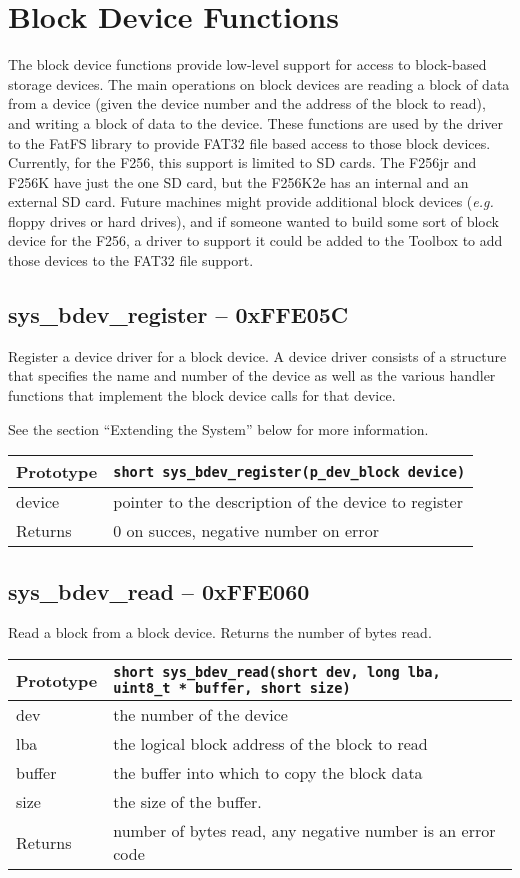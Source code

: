 \section{Block Device Functions}
The block device functions provide low-level support for access to block-based storage devices.
The main operations on block devices are reading a block of data from a device (given the device number and the
address of the block to read), and writing a block of data to the device.
These functions are used by the driver to the FatFS library to provide FAT32 file based access to those
block devices.
Currently, for the F256, this support is limited to SD cards. The F256jr and F256K have just the one SD card,
but the F256K2e has an internal and an external SD card.
Future machines might provide additional block devices ({\it e.g.} floppy drives or hard drives), and if someone
wanted to build some sort of block device for the F256, a driver to support it could be added to the Toolbox to
add those devices to the FAT32 file support.

\subsection*{sys\_bdev\_register -- 0xFFE05C}
Register a device driver for a block device. A device driver consists of a structure that specifies the name and number of the device as well as the various handler functions that implement the block device calls for that device.

See the section ``Extending the System'' below for more information.

\bigskip

\begin{tabular}{|l||l|} \hline
Prototype & \lstinline!short sys_bdev_register(p_dev_block device)! \\ \hline
device & pointer to the description of the device to register \\ \hline
Returns & 0 on succes, negative number on error \\ \hline
\end{tabular}

\subsection*{sys\_bdev\_read -- 0xFFE060}
Read a block from a block device. Returns the number of bytes read.

\bigskip

\begin{tabular}{|l||l|} \hline
Prototype & \lstinline!short sys_bdev_read(short dev, long lba, uint8_t * buffer, short size)! \\ \hline
dev & the number of the device \\ \hline
lba & the logical block address of the block to read \\ \hline
buffer & the buffer into which to copy the block data \\ \hline
size & the size of the buffer. \\ \hline
Returns & number of bytes read, any negative number is an error code \\ \hline
\end{tabular}

